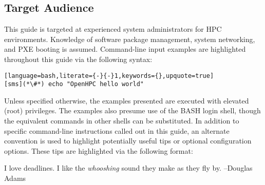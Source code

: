 \subsection{Target Audience}

This guide is targeted at experienced \Linux{} system administrators for HPC
environments. Knowledge of software package management, system networking, and
PXE booting is assumed. Command-line input examples are highlighted throughout
this guide via the following syntax:

\begin{lstlisting}[language=bash,literate={-}{-}1,keywords={},upquote=true]
[sms](*\#*) echo "OpenHPC hello world"
\end{lstlisting}

Unless specified otherwise, the examples presented are executed with
elevated (root) privileges. The examples also presume use of the BASH login
shell, though the equivalent commands in other shells can be substituted.
In addition to specific command-line instructions called out in this guide, an
alternate convention is used to highlight potentially useful tips or optional
configuration options. These tips are highlighted via the following format:

\begin{center}
\begin{tcolorbox}[]
\small
I love deadlines. I like the {\em whooshing} sound they make as they fly by.
--Douglas Adams 
\end{tcolorbox}
\end{center}

